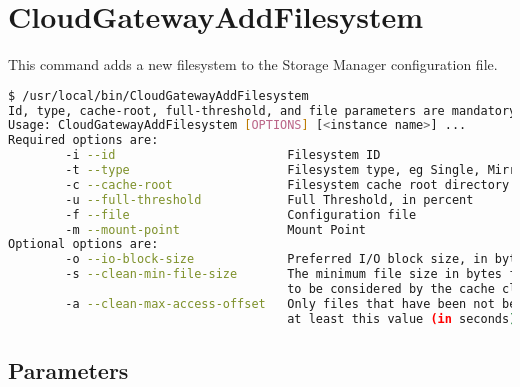 \documentclass[11pt,fleqn,openany]{book} %
\begin{document}
\section*{CloudGatewayAddFilesystem}
\label{sec:cloudgatewayaddfilesystem}

This command adds a new filesystem to the Storage Manager configuration file.

\begin{lstlisting}[language=bash]
$ /usr/local/bin/CloudGatewayAddFilesystem
Id, type, cache-root, full-threshold, and file parameters are mandatory.
Usage: CloudGatewayAddFilesystem [OPTIONS] [<instance name>] ...
Required options are:
        -i --id                        Filesystem ID
        -t --type                      Filesystem type, eg Single, Mirroring or Striping
        -c --cache-root                Filesystem cache root directory
        -u --full-threshold            Full Threshold, in percent
        -f --file                      Configuration file
        -m --mount-point               Mount Point
Optional options are:
        -o --io-block-size             Preferred I/O block size, in bytes
        -s --clean-min-file-size       The minimum file size in bytes for an object
                                       to be considered by the cache cleaning process
        -a --clean-max-access-offset   Only files that have been not been accessed for
                                       at least this value (in seconds) might be cleaned
\end{lstlisting}

\subsection*{Parameters}
\end{document}
